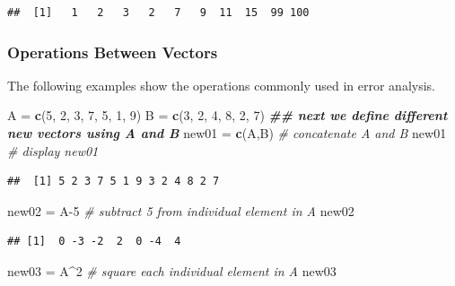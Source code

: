 \documentclass[
]{book}
\newenvironment{Shaded}{\begin{snugshade}}{\end{snugshade}}
\newcommand{\CommentTok}[1]{\textcolor[rgb]{0.56,0.35,0.01}{\textit{#1}}}
\newcommand{\DecValTok}[1]{\textcolor[rgb]{0.00,0.00,0.81}{#1}}
\newcommand{\DocumentationTok}[1]{\textcolor[rgb]{0.56,0.35,0.01}{\textbf{\textit{#1}}}}
\newcommand{\FunctionTok}[1]{\textcolor[rgb]{0.13,0.29,0.53}{\textbf{#1}}}
\newcommand{\NormalTok}[1]{#1}
\newcommand{\OtherTok}[1]{\textcolor[rgb]{0.56,0.35,0.01}{#1}}
\newcommand{\SpecialCharTok}[1]{\textcolor[rgb]{0.81,0.36,0.00}{\textbf{#1}}}
\begin{document}
\begin{verbatim}
##  [1]   1   2   3   2   7   9  11  15  99 100
\end{verbatim}

\hypertarget{operations-between-vectors}{%
\subsubsection{Operations Between Vectors}\label{operations-between-vectors}}

The following examples show the operations commonly used in error analysis.

\begin{Shaded}
\begin{Highlighting}[]
\NormalTok{A }\OtherTok{=} \FunctionTok{c}\NormalTok{(}\DecValTok{5}\NormalTok{, }\DecValTok{2}\NormalTok{, }\DecValTok{3}\NormalTok{, }\DecValTok{7}\NormalTok{, }\DecValTok{5}\NormalTok{, }\DecValTok{1}\NormalTok{, }\DecValTok{9}\NormalTok{)}
\NormalTok{B }\OtherTok{=} \FunctionTok{c}\NormalTok{(}\DecValTok{3}\NormalTok{, }\DecValTok{2}\NormalTok{, }\DecValTok{4}\NormalTok{, }\DecValTok{8}\NormalTok{, }\DecValTok{2}\NormalTok{, }\DecValTok{7}\NormalTok{)}
\DocumentationTok{\#\# next we define different new vectors using A and B}
\NormalTok{new01 }\OtherTok{=} \FunctionTok{c}\NormalTok{(A,B)    }\CommentTok{\# concatenate A and B}
\NormalTok{new01             }\CommentTok{\# display new01}
\end{Highlighting}
\end{Shaded}

\begin{verbatim}
##  [1] 5 2 3 7 5 1 9 3 2 4 8 2 7
\end{verbatim}

\begin{Shaded}
\begin{Highlighting}[]
\NormalTok{new02 }\OtherTok{=}\NormalTok{ A}\DecValTok{{-}5}       \CommentTok{\# subtract 5 from individual element in A }
\NormalTok{new02}
\end{Highlighting}
\end{Shaded}

\begin{verbatim}
## [1]  0 -3 -2  2  0 -4  4
\end{verbatim}

\begin{Shaded}
\begin{Highlighting}[]
\NormalTok{new03 }\OtherTok{=}\NormalTok{ A}\SpecialCharTok{\^{}}\DecValTok{2}       \CommentTok{\# square each individual element in A}
\NormalTok{new03}
\end{Highlighting}
\end{Shaded}
\end{document}
